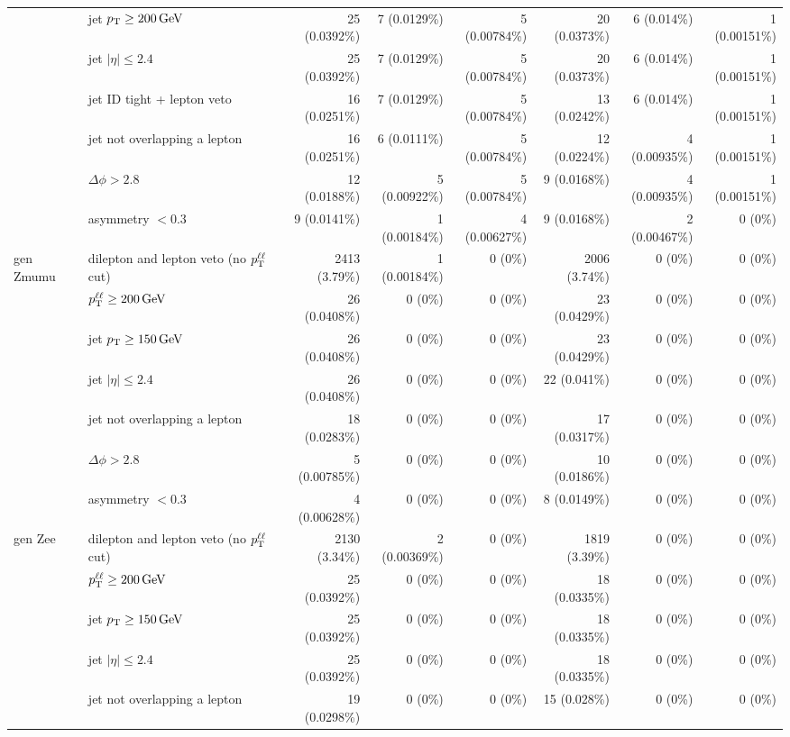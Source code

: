 \begin{tabular}{llrrrrrr}
 & jet $p_{\mathrm{T}} \geq 200\,\mathrm{GeV}$ & 25 (0.0392\%) & 7 (0.0129\%) & 5 (0.00784\%) & 20 (0.0373\%) & 6 (0.014\%) & 1 (0.00151\%) \\
 & jet $|\eta| \leq 2.4$ & 25 (0.0392\%) & 7 (0.0129\%) & 5 (0.00784\%) & 20 (0.0373\%) & 6 (0.014\%) & 1 (0.00151\%) \\
 & jet ID tight + lepton veto & 16 (0.0251\%) & 7 (0.0129\%) & 5 (0.00784\%) & 13 (0.0242\%) & 6 (0.014\%) & 1 (0.00151\%) \\
 & jet not overlapping a lepton & 16 (0.0251\%) & 6 (0.0111\%) & 5 (0.00784\%) & 12 (0.0224\%) & 4 (0.00935\%) & 1 (0.00151\%) \\
 & $\Delta\phi > 2.8$ & 12 (0.0188\%) & 5 (0.00922\%) & 5 (0.00784\%) & 9 (0.0168\%) & 4 (0.00935\%) & 1 (0.00151\%) \\
 & asymmetry $< 0.3$ & 9 (0.0141\%) & 1 (0.00184\%) & 4 (0.00627\%) & 9 (0.0168\%) & 2 (0.00467\%) & 0 (0\%) \\
\midrule
gen Zmumu & dilepton and lepton veto (no $p_{\mathrm{T}}^{\ell\ell}$ cut) & 2413 (3.79\%) & 1 (0.00184\%) & 0 (0\%) & 2006 (3.74\%) & 0 (0\%) & 0 (0\%) \\
 & $p_{\mathrm{T}}^{\ell\ell} \geq 200\,\mathrm{GeV}$ & 26 (0.0408\%) & 0 (0\%) & 0 (0\%) & 23 (0.0429\%) & 0 (0\%) & 0 (0\%) \\
 & jet $p_{\mathrm{T}} \geq 150\,\mathrm{GeV}$ & 26 (0.0408\%) & 0 (0\%) & 0 (0\%) & 23 (0.0429\%) & 0 (0\%) & 0 (0\%) \\
 & jet $|\eta| \leq 2.4$ & 26 (0.0408\%) & 0 (0\%) & 0 (0\%) & 22 (0.041\%) & 0 (0\%) & 0 (0\%) \\
 & jet not overlapping a lepton & 18 (0.0283\%) & 0 (0\%) & 0 (0\%) & 17 (0.0317\%) & 0 (0\%) & 0 (0\%) \\
 & $\Delta\phi > 2.8$ & 5 (0.00785\%) & 0 (0\%) & 0 (0\%) & 10 (0.0186\%) & 0 (0\%) & 0 (0\%) \\
 & asymmetry $< 0.3$ & 4 (0.00628\%) & 0 (0\%) & 0 (0\%) & 8 (0.0149\%) & 0 (0\%) & 0 (0\%) \\
\midrule
gen Zee & dilepton and lepton veto (no $p_{\mathrm{T}}^{\ell\ell}$ cut) & 2130 (3.34\%) & 2 (0.00369\%) & 0 (0\%) & 1819 (3.39\%) & 0 (0\%) & 0 (0\%) \\
 & $p_{\mathrm{T}}^{\ell\ell} \geq 200\,\mathrm{GeV}$ & 25 (0.0392\%) & 0 (0\%) & 0 (0\%) & 18 (0.0335\%) & 0 (0\%) & 0 (0\%) \\
 & jet $p_{\mathrm{T}} \geq 150\,\mathrm{GeV}$ & 25 (0.0392\%) & 0 (0\%) & 0 (0\%) & 18 (0.0335\%) & 0 (0\%) & 0 (0\%) \\
 & jet $|\eta| \leq 2.4$ & 25 (0.0392\%) & 0 (0\%) & 0 (0\%) & 18 (0.0335\%) & 0 (0\%) & 0 (0\%) \\
 & jet not overlapping a lepton & 19 (0.0298\%) & 0 (0\%) & 0 (0\%) & 15 (0.028\%) & 0 (0\%) & 0 (0\%) \\

\end{tabular}
